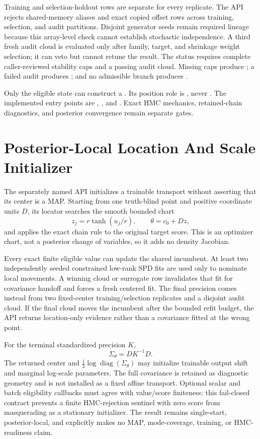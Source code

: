 Training and selection-holdout rows are separate for every replicate.  The API
rejects shared-memory aliases and exact copied offset rows across training,
selection, and audit partitions.  Disjoint generator seeds remain required
lineage because this array-level check cannot establish stochastic
independence.  A third fresh audit cloud is evaluated only after family, target,
and shrinkage weight selection; it can veto but cannot retune the result.  The
status  requires complete caller-reviewed
stability caps and a passing audit cloud.  Missing caps produce
; a failed audit produces
; and no admissible branch produces
.

Only the eligible state can construct a
.  Its position role is
, never .  The implemented entry points are
, , and
.  Exact HMC mechanics, retained-chain
diagnostics, and posterior convergence remain separate gates.

\section{Posterior-Local Location And Scale Initializer}
\label{sec:bf-api-posterior-local-initializer}

The separately named
 API initializes a trainable
transport without asserting that its center is a MAP.  Starting from one
truth-blind point and positive coordinate units $D$, its locator searches the
smooth bounded chart
\[
  z_j=r\tanh(u_j/r), \qquad \theta=c_0+Dz,
\]
and applies the exact chain rule to the original target score.  This is an
optimizer chart, not a posterior change of variables, so it adds no density
Jacobian.

Every exact finite eligible value can update the shared incumbent.  At least
two independently seeded constrained low-rank SPD fits are used only to
nominate local movements.  A winning cloud or surrogate row invalidates that
fit for covariance handoff and forces a fresh centered fit.  The final
precision comes instead from two fixed-center training/selection replicates
and a disjoint audit cloud.  If the final cloud moves the incumbent after the
bounded refit budget, the API returns location-only evidence rather than a
covariance fitted at the wrong point.

For the terminal standardized precision $K$,
\[
  \Sigma_{\theta}=D K^{-1}D.
\]
The returned center and $\tfrac12\log\operatorname{diag}(\Sigma_{\theta})$
may initialize trainable output shift and marginal log-scale parameters.  The
full covariance is retained as diagnostic geometry and is not installed as a
fixed affine transport.  Optional scalar and batch eligibility callbacks
must agree with value/score finiteness; this fail-closed contract prevents a
finite HMC-rejection sentinel with zero score from masquerading as a
stationary initializer.  The result remains single-start, posterior-local,
and explicitly makes no MAP, mode-coverage, training, or HMC-readiness claim.

